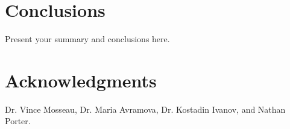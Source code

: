 \documentclass{mc2015}
\begin{document}
\section{Conclusions}

Present your summary and conclusions here.

\section{Acknowledgments}

Dr. Vince Mosseau, Dr. Maria Avramova, Dr. Kostadin Ivanov, and Nathan Porter.

\setlength{\baselineskip}{12pt}





\end{document}
